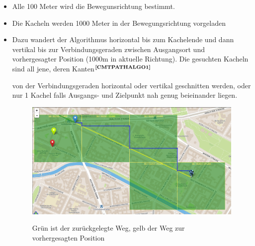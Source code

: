 \begin{itemize}[leftmargin=*,noitemsep,topsep=1ex,parsep=0pt,partopsep=0pt]
\begin{itemize}[leftmargin=*,noitemsep,topsep=1ex,parsep=0pt,partopsep=0pt]
		\item Alle 100 Meter wird die Bewegunsrichtung bestimmt.
		\item Die Kacheln werden 1000 Meter in der Bewegungsrichtung vorgeladen
		\item Dazu wandert der Algorithmus horizontal bis zum Kachelende und dann vertikal bis zur Verbindungsgeraden zwischen Ausgangsort und vorhergesagter Position (1000m in aktuelle Richtung). Die gesuchten Kacheln sind all jene, deren Kanten$^{\textbf{\ref{CMTPATHALGO1}}}$
\addtocounter{footnote}{1}%
 von der Verbindungsgeraden horizontal oder vertikal geschnitten werden, oder nur 1 Kachel falls Ausgangs- und Zielpunkt nah genug beieinander liegen.

  \begin{figure}[H]
  	\begin{adjustwidth}{-1cm}{1cm}
      \centering
	  \includegraphics[scale=0.6]{bilder/screenshots/move_prediction.png}\\ \vspace{0.8cm}
  	  \caption{Grün ist der zurückgelegte Weg, gelb der Weg zur vorhergesagten Position}
  	\end{adjustwidth}
  \end{figure}
		
	\end{itemize}
\end{itemize}

